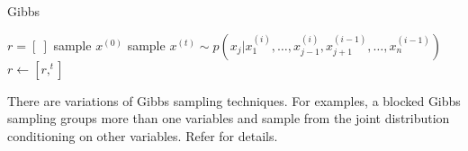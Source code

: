 \begin{algorithm}
\caption{Gibbs}\label{algo:gibbs}
\begin{algorithmic}[1]
\State $r = [\ ]$
\State sample $x^{(0)}$
\Repeat
  \State sample $x^{(t)} \sim p(x_j|x_1^{(i)},\dots,x_{j-1}^{(i)},x_{j+1}^{(i-1)},\dots,x_n^{(i-1)})$
  \State $r \gets [r,^{t}]$
\EndFunction
\end{algorithmic}
\end{algorithm}

There are variations of Gibbs sampling techniques. For examples, a blocked Gibbs sampling groups more than one variables and sample from the joint distribution conditioning on other variables. Refer \cite{RCP05} for details. 




